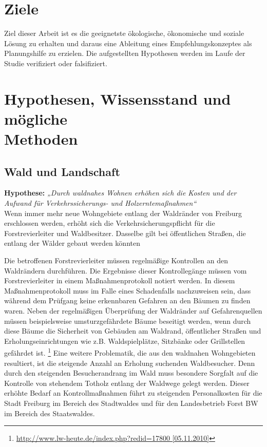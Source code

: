 \documentclass[12pt]{article}
\newcommand{\citefooturl}[1]{\footnote{\url{#1}}}
\begin{document}
\section{Ziele}
Ziel dieser Arbeit ist es die geeignetste ökologische, ökonomische und soziale Lösung zu 
erhalten und daraus eine Ableitung eines Empfehlungskonzeptes als Planungshilfe zu erzielen. 
Die aufgestellten Hypothesen werden im Laufe der Studie verifiziert oder falsifiziert.

\section{Hypothesen, Wissensstand und mögliche \\ Methoden}
\subsection{Wald und Landschaft}

\textbf{Hypothese:}	\textit{„Durch waldnahes Wohnen erhöhen sich die Kosten und der Aufwand für 
                 Verkehrssicherungs- und Holzerntemaßnahmen“} \\

Wenn immer mehr neue Wohngebiete entlang der Waldränder von Freiburg erschlossen werden, 
erhöht sich die Verkehrsicherungspflicht für die Forstrevierleiter und Waldbesitzer. 
Dasselbe gilt bei öffentlichen Straßen, die entlang der Wälder gebaut werden könnten
 
Die betroffenen Forstrevierleiter müssen regelmäßige Kontrollen an den Waldrändern durchführen. 
Die Ergebnisse dieser Kontrollegänge müssen vom Forstrevierleiter in einem Maßnahmenprotokoll 
notiert werden. In diesem Maßnahmenprotokoll muss im Falle eines Schadenfalls nachzuweisen sein,
dass während dem Prüfgang keine erkennbaren Gefahren an den Bäumen zu finden waren. Neben der 
regelmäßigen Überprüfung der Waldränder auf Gefahrenquellen müssen beispielsweise umsturzgefährdete 
Bäume beseitigt werden, wenn durch diese Bäume die Sicherheit von Gebäuden am Waldrand, öffentlicher 
Straßen und Erholungseinrichtungen wie z.B. Waldspielplätze, Sitzbänke oder Grillstellen gefährdet ist. 
\citefooturl{http://www.lw-heute.de/index.php?redid=17800 [05.11.2010]}
Eine weitere Problematik, die aus den waldnahen Wohngebieten resultiert, ist die steigende Anzahl an 
Erholung suchenden Waldbesucher. Denn durch den steigenden Besucherandrang im Wald muss besondere 
Sorgfalt auf die Kontrolle von stehendem Totholz entlang der Waldwege gelegt werden. 
Dieser erhöhte Bedarf an Kontrollmaßnahmen führt zu steigenden Personalkosten für die Stadt Freiburg 
im Bereich des Stadtwaldes und für den Landesbetrieb Forst BW im Bereich des Staatswaldes.
\end{document}
